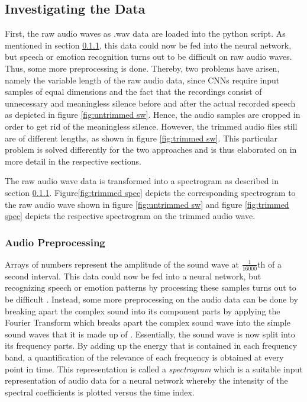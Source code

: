\documentclass[11pt,a4paper,twoside]{article}
\theoremstyle{thmbreak}
\numberwithin{Theorem}{subsection}
\theoremstyle{defbreak}
\theoremstyle{remark}
\theoremstyle{remark}
\begin{document}
\subsection{Investigating the Data}
First, the raw audio waves as .wav data are loaded into the python script. 
As mentioned in section \ref{2.3.1.1 Audio Preprocessing}, this data could now be fed into the neural network, but speech or emotion recognition turns out to be difficult on raw audio waves.
Thus, some more preprocessing is done.  
Thereby, two problems have arisen, namely the variable length of the raw audio data, since CNNs require input samples of equal dimensions and the fact that the recordings consist of  unnecessary and meaningless silence  before and after the actual recorded speech as depicted in figure \ref{fig:untrimmed sw}. 
Hence, the audio samples are cropped in order to get rid of the meaningless silence.
However, the trimmed audio files  still are of different lengths, as shown in figure \ref{fig:trimmed sw}. 
This particular problem is solved differently for the two approaches and is thus elaborated on in more detail in the respective sections.

The raw audio wave data is  transformed into a spectrogram  as described in section \ref{2.3.1.1 Audio Preprocessing}. 
Figure\ref{fig:trimmed spec} depicts the corresponding spectrogram to the raw audio wave shown in figure \ref{fig:untrimmed sw} and figure \ref{fig:trimmed spec} depicts the respective spectrogram on the trimmed audio wave.


\subsubsection{Audio Preprocessing}
\label{2.3.1.1 Audio Preprocessing}
Arrays of numbers represent the amplitude of the sound wave at $\frac{1}{16000}$th of a second interval. 
This data could now be fed into a neural network, but recognizing speech or emotion patterns by processing these samples turns out to be difficult \cite{geitgey2016}. 
Instead, some more preprocessing on the audio data can be done by breaking apart the complex sound into its component parts by applying the Fourier Transform which breaks apart the complex sound wave into the simple sound waves that it is made up of \cite{Goodfellow-et-al-2016}.
Essentially, the sound wave is now split into its frequency parts. By adding up the energy that is contained in each frequency band, a quantification of the relevance of each frequency is obtained at every point in time. 
This representation is called a \textit{spectrogram} which is a suitable input representation of audio data for a neural network whereby the intensity of the spectral coefficients  is plotted versus the time index.
\end{document}
